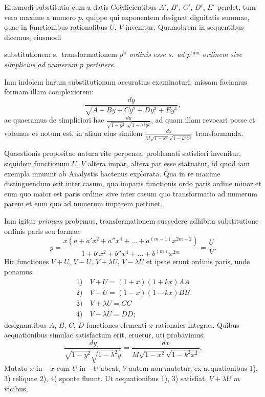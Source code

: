 \documentclass{article}
\begin{document}
Eiusmodi substitutio cum a datis Coëfficientibus $A'$, $B'$, $C'$, $D'$, $E'$ pendet, tum vero maxime a numero $p$, quippe qui exponentem designat dignitatis summae, quae in functionibus rationalibus $U$, $V$ invenitur. Quamobrem in sequentibus dicemus, eiusmodi

substitutionem s.\ transformationem \emph{$p^{\mathrm{ti}}$ ordinis esse s.\ ad $p^{\mathrm{tum}}$ ordinem sive simplicius ad numerum $p$ pertinere.}

Iam indolem harum substitutionum accuratius examinaturi, missam faciamus formam illam complexiorem:
\[
\frac{dy}{\sqrt{A+By+Cy^{2}+Dy^{3}+Ey^{4}}},
\]
ac quaeramus de simpliciori hac $\frac{dy}{\sqrt{1-y^{2}}.\sqrt{1-\lambda^{2}y^{2}}}$, ad quam illam revocari posse et videmus et notum est, in aliam eius similem $\frac{dx}{M\sqrt{1-x^{2}}\sqrt{1-k^{2}x^{2}}}$ transformanda.

Quaestionis propositae natura rite perpensa, problemati satisfieri invenitur, siquidem functionum $U$, $V$ altera impar, altera par esse statuatur, id quod iam exempla innuunt ab Analystis hactenus explorata. Qua in re maxime distinguendum erit inter casum, quo imparis functionis ordo paris ordine minor et eum quo maior est paris ordine; sive inter casum quo transformatio ad numerum parem et eum quo ad numerum imparem pertinet.

Iam igitur \emph{primum} probemus, transformationem succedere adhibita substitutione ordinis paris seu formae:
\[
y=\frac{x\left(a+a'x^{2}+a''x^{4}+\ldots+a^{(m-1)}x^{2m-2}\right)}{1+b'x^{2}+b''x^{4}+\ldots+b^{(m)}x^{2m}}=\frac{U}{V}.
\]
Hic functiones $V+U$, $V-U$, $V+\lambda U$, $V-\lambda U$ et ipsae erunt ordinis paris, unde ponamus:
\[
\begin{gathered}
\text{1)}\quad V+U=(1+x)(1+kx)AA\\
\text{2)}\quad V-U=(1-x)(1-kx)BB\\
\text{3)}\quad V+\lambda U=CC\\
\text{4)}\quad V-\lambda U=DD;
\end{gathered}
\]
designantibus $A$, $B$, $C$, $D$ functiones elementi $x$ rationales integras. Quibus aequationibus simulac satisfactum erit, eruetur, uti probavimus:
\[
\frac{dy}{\sqrt{1-y^{2}}\sqrt{1-\lambda^{2}y}}=\frac{dx}{M\sqrt{1-x^{2}}\sqrt{1-k^{2}x^{2}}}.
\]
Mutato $x$ in $-x$ cum $U$ in $-U$ abeat, $V$ autem non mutetur, ex aequationibus 1), 3) reliquae 2), 4) sponte fluunt. Ut aequationibus 1), 3) satisfiat, $V+\lambda U$ $m$ vicibus,
\end{document}
